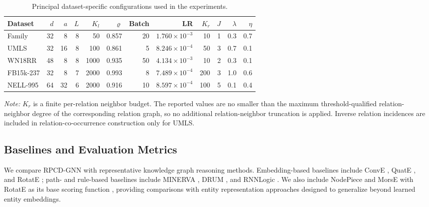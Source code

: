 \documentclass[a4paper,fleqn]{cas-dc}
\newcommand{\papertablestyle}{%
  \footnotesize
  \renewcommand{\arraystretch}{1.12}%
  \setlength{\tabcolsep}{3pt}%
}
\begin{document}
\begin{table}[width=0.85\textwidth,pos=t]
\caption{Principal dataset-specific configurations used in the experiments.}
\label{tab:implementation-settings}
\centering
\papertablestyle
\begin{tabular*}{\tblwidth}{@{}l@{\extracolsep{\fill}}rrrrrrrrrrr@{}}
\toprule
Dataset & $d$ & $a$ & $L$ & $K_l$ & $\varrho$ & Batch & LR & $K_r$ & $J$ & $\lambda$ & $\eta$ \\
\midrule
Family & 32 & 8 & 8 & 50 & 0.857 & 20 & $1.760\!\times\!10^{-3}$ & 10 & 1 & 0.3 & 0.7 \\
UMLS & 32 & 16 & 8 & 100 & 0.861 & 5 & $8.246\!\times\!10^{-4}$ & 50 & 3 & 0.7 & 0.1 \\
WN18RR & 48 & 8 & 8 & 1000 & 0.935 & 50 & $4.134\!\times\!10^{-3}$ & 10 & 2 & 0.3 & 0.1 \\
FB15k-237 & 32 & 8 & 7 & 2000 & 0.993 & 8 & $7.489\!\times\!10^{-4}$ & 200 & 3 & 1.0 & 0.6 \\
NELL-995 & 64 & 32 & 6 & 2000 & 0.916 & 10 & $8.597\!\times\!10^{-4}$ & 100 & 5 & 0.1 & 0.4 \\
\bottomrule
\end{tabular*}
\vspace{2pt}

\parbox{\tblwidth}{\footnotesize \emph{Note:} $K_r$ is a finite per-relation neighbor budget. The reported values are no smaller than the maximum threshold-qualified relation-neighbor degree of the corresponding relation graph, so no additional relation-neighbor truncation is applied. Inverse relation incidences are included in relation-co-occurrence construction only for UMLS.}
\end{table}

\subsection{Baselines and Evaluation Metrics}\label{subsec:baselines-metrics}

We compare RPCD-GNN with representative knowledge graph reasoning methods. Embedding-based baselines include ConvE \citep{Dettmers2018ConvE}, QuatE \citep{Zhang2019QuatE}, and RotatE \citep{Sun2019RotatE}; path- and rule-based baselines include MINERVA \citep{Das2018MINERVA}, DRUM \citep{Sadeghian2019DRUM}, and RNNLogic \citep{Qu2021RNNLogic}. We also include NodePiece \citep{Galkin2022NodePiece} and MorsE with RotatE as its base scoring function \citep{Chen2021MorsE}, providing comparisons with entity representation approaches designed to generalize beyond learned entity embeddings.
\end{document}
